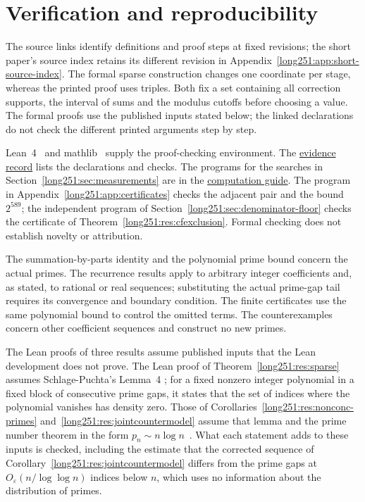 \documentclass[11pt]{article}
\makeatletter
\newcommand{\compatlabel}[1]{\ltx@label{#1}}
\makeatother
\begin{document}
\section{Verification and reproducibility}\label{long251:app:index}\compatlabel{app:index}
\evidenceparagraph{\evidencerecordurl}
The source links identify definitions and proof steps at fixed revisions;
the short paper's source index retains its different revision in
Appendix~\ref{long251:app:short-source-index}. The formal sparse
construction changes one coordinate per stage, whereas the printed
proof uses triples. Both fix a set containing all correction supports,
the interval of sums and the modulus cutoffs before choosing a value. The formal proofs use the
published inputs stated below; the linked declarations do not check
the different printed arguments step by step.

Lean~4~\cite{lean4} and mathlib~\cite{mathlib} supply the proof-checking
environment. The \href{\evidencerecordurl}{evidence record} lists the
declarations and checks. The programs for the searches in
Section~\ref{long251:sec:measurements} are in the
\href{https://github.com/wcook04/plectis-erdos/blob/dd6cc708f650f061de06594eba6ba43878f4de31/research/experiments/erdos251/README.md}{computation guide}.
The program in Appendix~\ref{long251:app:certificates} checks the
adjacent pair and the bound $2^{589}$; the independent program of
Section~\ref{long251:sec:denominator-floor} checks the certificate of
Theorem~\ref{long251:res:cfexclusion}. Formal checking does not
establish novelty or attribution.

The summation-by-parts identity and the polynomial prime bound concern the
actual primes.  The recurrence results apply to arbitrary integer
coefficients and, as stated, to rational or real sequences; substituting
the actual prime-gap tail requires its convergence and boundary condition.
The finite certificates use the same polynomial bound to control the
omitted terms.  The counterexamples concern other coefficient sequences
and construct no new primes.

The Lean proofs of three results assume published inputs that the Lean
development does not prove.  The Lean proof of
Theorem~\ref{long251:res:sparse} assumes Schlage-Puchta's
Lemma~4 \cite[Lemma~4, pp.~5--6]{schlagepuchta2011}; for a fixed nonzero
integer polynomial in a fixed block of consecutive prime gaps, it states
that the set of indices where the polynomial vanishes has density zero.
Those of Corollaries~\ref{long251:res:nonconc-primes}
and~\ref{long251:res:jointcountermodel} assume that lemma and the prime
number theorem in the form $p_n\sim n\log n$~\cite[Chapter~6]{mv2007}.
What each statement adds to these inputs is checked, including the
estimate that the corrected sequence of
Corollary~\ref{long251:res:jointcountermodel} differs from the prime gaps
at $O_\varepsilon(n/\log\log n)$ indices below $n$, which uses no
information about the distribution of primes.
\end{document}

